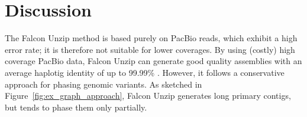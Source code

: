 

\vspace{1cm}
\section{Discussion}
The Falcon Unzip method \citep{chin2016phased} is based purely on PacBio reads, which exhibit a high error rate; it is therefore not suitable for lower coverages.
By using (costly) high coverage PacBio data, Falcon Unzip can generate good quality assemblies with an average haplotig identity of up to 99.99\% \citep{chin2016phased}.
However, it follows a conservative approach for phasing genomic variants.
As sketched in Figure~\ref{fig:ex_graph_approach}, Falcon Unzip generates long primary contigs, but tends to phase them only partially.

